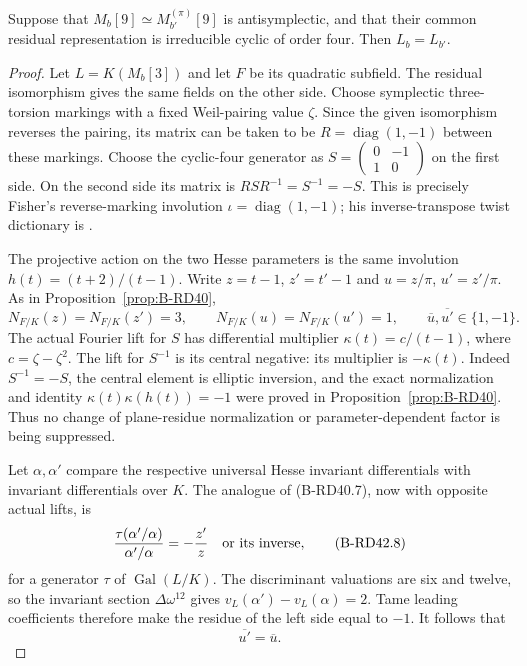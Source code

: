\begin{lemma}
\label{lem:B-RD42-reverse}
Suppose that $M_b[9]\simeq M_{b'}^{(\pi)}[9]$ is antisymplectic,
and that their common residual representation is irreducible cyclic
of order four. Then $L_b=L_{b'}$.
\end{lemma}
\begin{proof}
Let $L=K(M_b[3])$ and let $F$ be its quadratic subfield. The residual
isomorphism gives the same fields on the other side. Choose symplectic
three-torsion markings with a fixed Weil-pairing value $\zeta$. Since
the given isomorphism reverses the pairing, its matrix can be taken
to be $R=\operatorname{diag}(1,-1)$ between these markings. Choose
the cyclic-four generator as
$S=\left(\begin{smallmatrix}0&-1\\1&0\end{smallmatrix}\right)$
on the first side. On the second side its matrix is
$RSR^{-1}=S^{-1}=-S$. This is precisely Fisher's reverse-marking
involution $\iota=\operatorname{diag}(1,-1)$; his inverse-transpose
twist dictionary is \citet[Section~3, p.~7, and Lemma~3.2, pp.~7--8]
{Fisher2015Nine}.

The projective action on the two Hesse parameters is the same
involution $h(t)=(t+2)/(t-1)$. Write $z=t-1$, $z'=t'-1$ and
$u=z/\pi$, $u'=z'/\pi$. As in Proposition~\ref{prop:B-RD40},
\[
 N_{F/K}(z)=N_{F/K}(z')=3,\qquad
 N_{F/K}(u)=N_{F/K}(u')=1,\qquad
 \overline u,\overline{u'}\in\{1,-1\}.
                                                        \tag{B-RD42.7}
\]
The actual Fourier lift for $S$ has differential multiplier
$\kappa(t)=c/(t-1)$, where $c=\zeta-\zeta^2$. The lift for $S^{-1}$
is its central negative: its multiplier is $-\kappa(t)$.
Indeed $S^{-1}=-S$, the central element is elliptic inversion,
and the exact normalization and identity
$\kappa(t)\kappa(h(t))=-1$ were proved in
Proposition~\ref{prop:B-RD40}. Thus no change of plane-residue
normalization or parameter-dependent factor is being suppressed.

Let $\alpha,\alpha'$ compare the respective universal Hesse
invariant differentials with invariant differentials over $K$.
The analogue of (B-RD40.7), now with opposite actual lifts, is
\[
       \frac{\tau(\alpha'/\alpha)}{\alpha'/\alpha}
                 =-\frac{z'}z\quad\hbox{or its inverse},
                                                        \tag{B-RD42.8}
\]
for a generator $\tau$ of $\operatorname{Gal}(L/K)$.
The discriminant valuations are six and twelve, so the invariant
section $\Delta\omega^{12}$ gives
$v_L(\alpha')-v_L(\alpha)=2$. Tame leading coefficients therefore
make the residue of the left side equal to $-1$. It follows that
\[
                            \overline{u'}=\overline u.
                                                        \tag{B-RD42.9}
\]


\end{proof}

